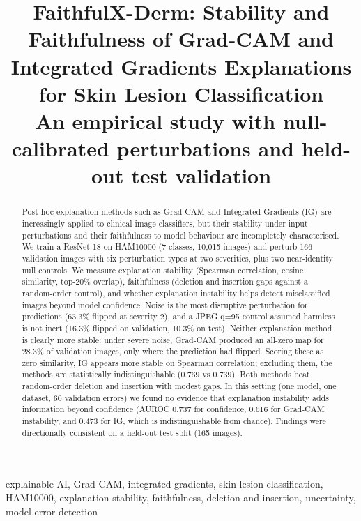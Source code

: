 \documentclass[conference]{IEEEtran}
\begin{document}
\title{FaithfulX-Derm: Stability and Faithfulness of Grad-CAM and
Integrated Gradients Explanations for Skin Lesion Classification\\
{\footnotesize An empirical study with null-calibrated perturbations and
held-out test validation}
}

\author{
}

\maketitle

\begin{abstract}
Post-hoc explanation methods such as Grad-CAM and Integrated Gradients (IG)
are increasingly applied to clinical image classifiers, but their stability
under input perturbations and their faithfulness to model behaviour are
incompletely characterised. We train a ResNet-18 on HAM10000 (7 classes,
10,015 images) and perturb 166 validation images with six perturbation types
at two severities, plus two near-identity null controls. We measure
explanation stability (Spearman correlation, cosine similarity, top-20\%
overlap), faithfulness (deletion and insertion gaps against a random-order
control), and whether explanation instability helps detect misclassified
images beyond model confidence. Noise is the most disruptive perturbation
for predictions (63.3\% flipped at severity 2), and a JPEG q=95 control
assumed harmless is not inert (16.3\% flipped on validation, 10.3\% on
test). Neither explanation method is clearly more stable: under severe
noise, Grad-CAM produced an all-zero map for 28.3\% of validation images,
only where the prediction had flipped. Scoring these as zero similarity, IG
appears more stable on Spearman correlation; excluding them, the methods are
statistically indistinguishable (0.769 vs 0.739). Both methods beat
random-order deletion and insertion with modest gaps. In this setting (one
model, one dataset, 60 validation errors) we found no evidence that
explanation instability adds information beyond confidence (AUROC 0.737 for
confidence, 0.616 for Grad-CAM instability, and 0.473 for IG, which is
indistinguishable from chance). Findings were directionally consistent on a
held-out test split (165 images).
\end{abstract}

\begin{IEEEkeywords}
explainable AI, Grad-CAM, integrated gradients, skin lesion classification,
HAM10000, explanation stability, faithfulness, deletion and insertion,
uncertainty, model error detection
\end{IEEEkeywords}
\end{document}
